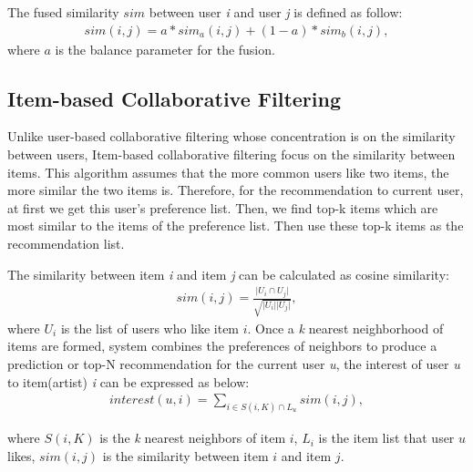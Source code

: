 \documentclass{sig-alternate}
\begin{document}
The fused similarity $sim$ between user \textsl{i} and user \textsl{j} is defined as follow:
\begin{gather*}
sim(i, j) = a * sim_a(i, j) + (1-a) * sim_b(i, j),
\end{gather*}
\indent where $a$ is the balance parameter for the fusion.
\subsection{Item-based Collaborative Filtering}
Unlike user-based collaborative filtering whose concentration is on the similarity between users, Item-based collaborative filtering focus on the similarity between items. This algorithm assumes that the more common users like two items, the more similar the two items is. Therefore, for the recommendation to current user, at first we get this user's preference list. Then, we find top-k items which are most similar to the items of the preference list. Then use these top-k items as the recommendation list.

The similarity between item \textsl{i} and item \textsl{j} can be calculated as cosine similarity:
\begin{gather*}
sim(i, j)= \frac{\vert U_i  \cap U_j \vert}{\sqrt{\vert U_i \vert \vert U_j \vert}},
\end{gather*}
\indent where $U_i$ is the list of users who like item $i$.
\indent Once a \textsl{k} nearest neighborhood of items are formed, system combines the preferences of neighbors to produce a prediction or top-N recommendation for the current user \textsl{u}, the interest of user \textsl{u} to item(artist) \textsl{i} can be expressed as below:
\begin{gather*}
interest(u, i)= \sum_{i \in S(i, K) \cap L_u} sim(i, j),
\end{gather*}

\indent where $S(i, K)$ is the \textsl{k} nearest neighbors of item $i$, $L_i$ is the item list that user $u$ likes, $sim(i, j)$ is the similarity between item $i$ and item $j$.
\end{document}
